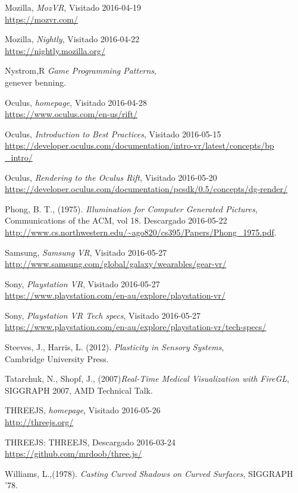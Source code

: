 \documentclass[12pt]{article}
\begin{document}
\begin{thebibliography}{9}
Mozilla, \textit{MozVR},
Visitado 2016-04-19
\\\url{https://mozvr.com/}

Mozilla, \textit{Nightly},
Visitado 2016-04-22
\\\url{https://nightly.mozilla.org/}

Nystrom,R \textit{Game Programming Patterns},\\
genever benning.

Oculus, \textit{homepage},
Visitado 2016-04-28
\\\url{https://www.oculus.com/en-us/rift/}

Oculus, \textit{Introduction to Best Practices},
Visitado 2016-05-15
\\\url{https://developer.oculus.com/documentation/intro-vr/latest/concepts/bp	
_intro/}

Oculus, \textit{Rendering to the Oculus Rift},
Visitado 2016-05-20
\\\url{https://developer.oculus.com/documentation/pcsdk/0.5/concepts/dg-render/}

Phong, B. T., (1975). \textit{Illumination for Computer Generated Pictures},\\
Communications of the ACM, vol 18.
Descargado 2016-05-22
\\\url{http://www.cs.northwestern.edu/~ago820/cs395/Papers/Phong_1975.pdf}.  

Samsung, \textit{Samsung VR},
Visitado 2016-05-27
\\\url{http://www.samsung.com/global/galaxy/wearables/gear-vr/}

Sony, \textit{ Playstation VR},
Visitado 2016-05-27
\\\url{https://www.playstation.com/en-au/explore/playstation-vr/}

Sony, \textit{ Playstation VR Tech specs},
Visitado 2016-05-27
\\\url{https://www.playstation.com/en-au/explore/playstation-vr/tech-specs/}


Steeves, J., Harris, L. (2012). \textit{Plasticity in Sensory Systems},\\
Cambridge University Press.


Tatarchuk, N., Shopf, J., (2007)\textit{Real-Time Medical Visualization with FireGL},
SIGGRAPH 2007, AMD Technical Talk.

THREEJS, \textit{homepage},
Visitado 2016-05-26
\\\url{http://threejs.org/}

THREEJS: THREEJS,
Descargado 2016-03-24
\\\url{https://github.com/mrdoob/three.js/}

Williams, L.,(1978). \textit{Casting Curved Shadows on Curved Surfaces},
SIGGRAPH '78. 

\end{thebibliography}
\end{document}
